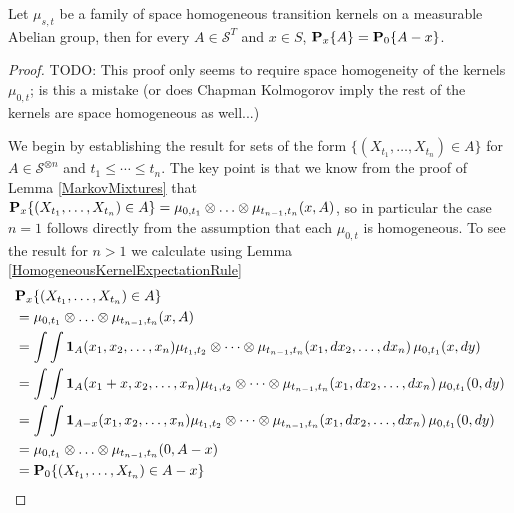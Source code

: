 \begin{lem}\label{SpaceHomogeneousMarkovDistributions}Let $\mu_{s,t}$
  be a family of space homogeneous transition kernels on a
  measurable Abelian group, then for every $A \in \mathcal{S}^T$ and $x \in S$,
  $\sprobability{A}{x} = \sprobability{A-x}{0}$.
\end{lem}
\begin{proof}
TODO: This proof only seems to require space homogeneity of the
kernels $\mu_{0,t}$; is this a mistake (or does Chapman Kolmogorov
imply the rest of the kernels are space homogeneous as well...)

We begin by establishing the result for sets of the form $\lbrace (X_{t_1},
\dotsc, X_{t_n}) \in A \rbrace$ for $A \in \mathcal{S}^{\otimes n}$ and $t_1 \leq
\cdots \leq t_n$.  The key point is that we know from the proof of
Lemma \ref{MarkovMixtures} that $\sprobability{(X_{t_1},
\dotsc, X_{t_n}) \in A }{x} = \mu_{0, t_1} \otimes \dotsc \otimes
\mu_{t_{n-1}, t_n}(x, A)$, so in particular the case $n=1$ follows
directly from the assumption that each $\mu_{0, t}$ is homogeneous.
To see the result for $n > 1$ we calculate using Lemma \ref{HomogeneousKernelExpectationRule}
\begin{align*}
&\sprobability{(X_{t_1},\dotsc, X_{t_n}) \in A }{x} \\
&= \mu_{0, t_1} \otimes \dotsc \otimes \mu_{t_{n-1}, t_n}(x, A) \\
&= \int \int \characteristic{A}(x_1, x_2, \dotsc, x_n) \mu_{t_1, t_2} \otimes \cdots \otimes \mu_{t_{n-1},
  t_n}(x_1, dx_2, \dotsc, dx_n) \, \mu_{0,t_1}(x, dy) \\
&= \int \int \characteristic{A}(x_1+x, x_2, \dotsc, x_n) \mu_{t_1, t_2} \otimes \cdots \otimes \mu_{t_{n-1},
  t_n}(x_1, dx_2, \dotsc, dx_n) \, \mu_{0,t_1}(0, dy) \\
&= \int \int \characteristic{A-x}(x_1, x_2, \dotsc, x_n) \mu_{t_1, t_2} \otimes \cdots \otimes \mu_{t_{n-1},
  t_n}(x_1, dx_2, \dotsc, dx_n) \, \mu_{0,t_1}(0, dy) \\
&= \mu_{0, t_1} \otimes \dotsc \otimes \mu_{t_{n-1}, t_n}(0, A-x) \\
&=\sprobability{(X_{t_1},\dotsc, X_{t_n}) \in A - x}{0} \\
\end{align*}


\end{proof}
